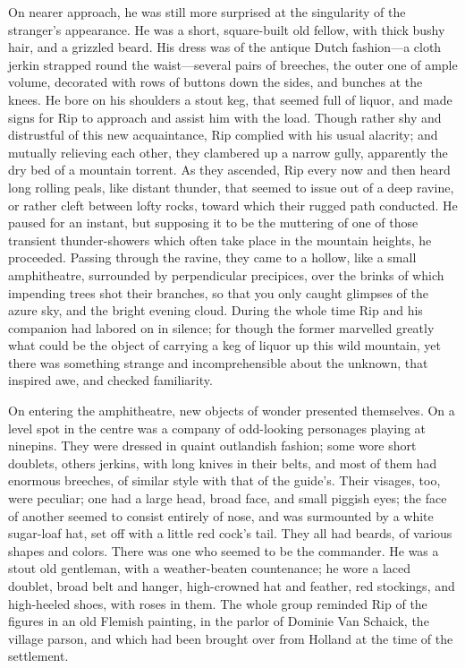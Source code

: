 On nearer approach, he was still more surprised at the singularity of the stranger’s appearance. He was a short, square-built old fellow, with thick bushy hair, and a grizzled beard. His dress was of the antique Dutch fashion—a cloth jerkin strapped round the waist—several pairs of breeches, the outer one of ample volume, decorated with rows of buttons down the sides, and bunches at the knees. He bore on his shoulders a stout keg, that seemed full of liquor, and made signs for Rip to approach and assist him with the load. Though rather shy and distrustful of this new acquaintance, Rip complied with his usual alacrity; and mutually relieving each other, they clambered up a narrow gully, apparently the dry bed of a mountain torrent. As they ascended, Rip every now and then heard long rolling peals, like distant thunder, that seemed to issue out of a deep ravine, or rather cleft between lofty rocks, toward which their rugged path conducted. He paused for an instant, but supposing it to be the muttering of one of those transient thunder-showers which often take place in the mountain heights, he proceeded. Passing through the ravine, they came to a hollow, like a small amphitheatre, surrounded by perpendicular precipices, over the brinks of which impending trees shot their branches, so that you only caught glimpses of the azure sky, and the bright evening cloud. During the whole time Rip and his companion had labored on in silence; for though the former marvelled greatly what could be the object of carrying a keg of liquor up this wild mountain, yet there was something strange and incomprehensible about the unknown, that inspired awe, and checked familiarity.

On entering the amphitheatre, new objects of wonder presented themselves. On a level spot in the centre was a company of odd-looking personages playing at ninepins. They were dressed in quaint outlandish fashion; some wore short doublets, others jerkins, with long knives in their belts, and most of them had enormous breeches, of similar style with that of the guide’s. Their visages, too, were peculiar; one had a large head, broad face, and small piggish eyes; the face of another seemed to consist entirely of nose, and was surmounted by a white sugar-loaf hat, set off with a little red cock’s tail. They all had beards, of various shapes and colors. There was one who seemed to be the commander. He was a stout old gentleman, with a weather-beaten countenance; he wore a laced doublet, broad belt and hanger, high-crowned hat and feather, red stockings, and high-heeled shoes, with roses in them. The whole group reminded Rip of the figures in an old Flemish painting, in the parlor of Dominie Van Schaick, the village parson, and which had been brought over from Holland at the time of the settlement.

